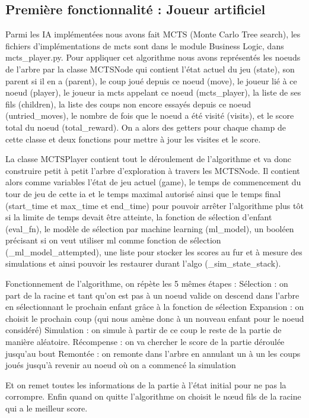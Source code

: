 \documentclass[11pt]{article}
\begin{document}
\subsection{Première fonctionnalité : Joueur artificiel}

Parmi les IA implémentées nous avons fait MCTS (Monte Carlo Tree search), les fichiers d’implémentations de mcts sont dans le module Business Logic, dans mcts\_player.py. Pour appliquer cet algorithme nous avons représentés les noeuds de l’arbre par la classe MCTSNode qui contient l’état actuel du jeu (state), son parent si il en a (parent), le coup joué depuis ce noeud (move), le joueur lié à ce noeud (player), le joueur ia mcts appelant ce noeud (mcts\_player), la liste de ses fils (children), la liste des coups non encore essayés depuis ce noeud (untried\_moves), le nombre de fois que le noeud a été visité (visits), et le score total du noeud (total\_reward).
On a alors des getters pour chaque champ de cette classe et deux fonctions pour mettre à jour les visites et le score.

La classe MCTSPlayer contient tout le déroulement de l’algorithme et va donc construire petit à petit l’arbre d’exploration à travers les MCTSNode. Il contient alors comme variables l’état de jeu actuel (game), le temps de commencement du tour de jeu de cette ia et le temps maximal autorisé ainsi que le temps final (start\_time et max\_time et end\_time) pour pouvoir arrêter l’algorithme plus tôt si la limite de temps devait être atteinte, la fonction de sélection d’enfant (eval\_fn), le modèle de sélection par machine learning (ml\_model), un booléen précisant si on veut utiliser ml comme fonction de sélection (\_ml\_model\_attempted), une liste pour stocker les scores au fur et à mesure des simulations et ainsi pouvoir les restaurer durant l’algo (\_sim\_state\_stack).

Fonctionnement de l’algorithme, on répète les 5 mêmes étapes :
Sélection : on part de la racine et tant qu’on est pas à un noeud valide on descend dans l’arbre en sélectionnant le prochain enfant grâce à la fonction de sélection
Expansion : on choisit le prochain coup (qui nous amène donc à un nouveau enfant pour le noeud considéré)
Simulation : on simule à partir de ce coup le reste de la partie de manière aléatoire.
Récompense : on va chercher le score de la partie déroulée jusqu’au bout 
Remontée : on remonte dans l’arbre en annulant un à un les coups joués jusqu’à revenir au noeud où on a commencé la simulation

Et on remet toutes les informations de la partie à l’état initial pour ne pas la corrompre.
Enfin quand on quitte l’algorithme on choisit le nœud fils de la racine qui a le meilleur score.
\end{document}
